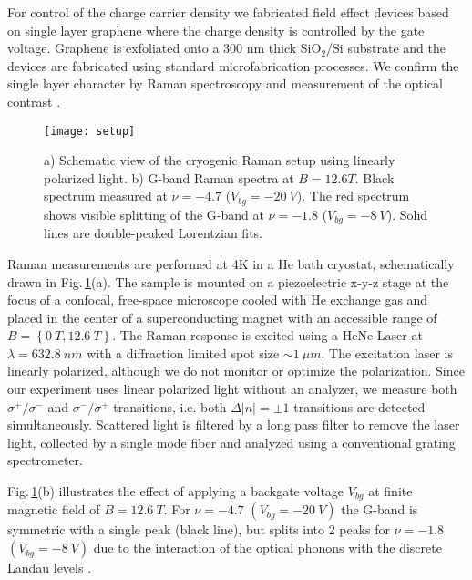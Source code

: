 \documentclass[prl,aps,superscriptaddress,showpacs,reprint]{revtex4-1}
\begin{document}
For control of the charge carrier density we fabricated field effect devices based on single layer graphene where the charge density is controlled by the gate voltage. Graphene is exfoliated onto a 300 nm thick SiO$_2$/Si substrate and the devices are fabricated using standard microfabrication processes. We confirm the single layer character by Raman spectroscopy and measurement of the optical contrast \cite{ferrari2006raman,casiraghi2007rayleigh,ni2007graphene,blake2007making}.


\begin{figure}
\texttt{[image: setup]}
\caption{\label{setup}a) Schematic view of the cryogenic Raman setup using linearly polarized light. b) G-band Raman spectra at $B=12.6T$. Black spectrum measured at $\nu=-4.7$ ($V_{bg}=-20\: V$). The red spectrum shows visible splitting of the G-band at $\nu=-1.8$ ($V_{bg}=-8\: V$). Solid lines are double-peaked Lorentzian fits.}
\end{figure}


Raman measurements are performed at 4K in a He bath cryostat, schematically drawn in Fig.\,\ref{setup}(a). The sample is mounted on a piezoelectric x-y-z stage at the focus of a confocal, free-space microscope cooled with He exchange gas and placed in the center of a superconducting magnet with an accessible range of $B=\left\lbrace 0\: T,12.6\: T \right\rbrace$.
The Raman response is excited using a HeNe Laser at $\lambda=632.8\: nm$ with a diffraction limited spot size $\sim 1\: \mu m$. The excitation laser is linearly polarized, although we do not monitor or optimize the polarization. Since our experiment uses linear polarized light without an analyzer, we measure both  $\sigma^+/\sigma^-$  and $\sigma^-/\sigma^+$ transitions, i.e. both $\Delta |n|=\pm1$ transitions are detected simultaneously. Scattered light is filtered by a long pass filter to remove the laser light, collected by a single mode fiber and analyzed using a conventional grating spectrometer.

Fig.\,\ref{setup}(b) illustrates the effect of applying a backgate voltage $V_{bg}$ at finite magnetic field of $B=12.6\: T$. For $\nu =-4.7$ $(V_{bg}=-20\: V)$ the G-band is symmetric with a single peak (black line), but splits into 2 peaks for $\nu=-1.8$ $(V_{bg}=-8\: V)$ due to the interaction of the optical phonons with the discrete Landau levels \cite{kias2009} .
\end{document}
